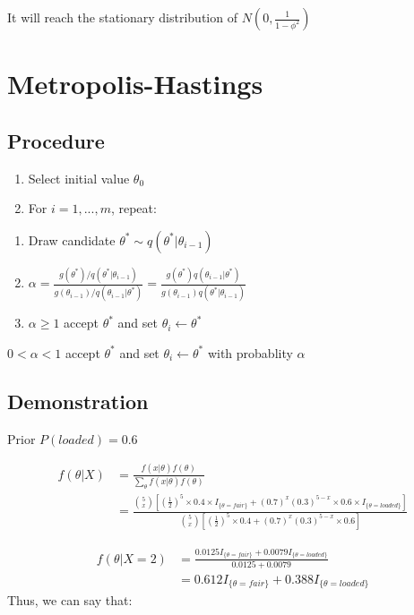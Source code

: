 \documentclass[]{book}
\begin{document}
It will reach the stationary distribution of
\(N(0, \frac{1}{1-\phi^2})\)

\section{Metropolis-Hastings}\label{metropolis-hastings}

\subsection{Procedure}\label{procedure}

\begin{enumerate}
\def\labelenumi{(\arabic{enumi})}
\item
  Select initial value \(\theta_0\)
\item
  For \(i=1,..., m\), repeat:
\end{enumerate}

\begin{enumerate}
\def\labelenumi{(\alph{enumi})}
\item
  Draw candidate \(\theta^* \sim q(\theta^*|\theta_{i-1})\)
\item
  \(\alpha=\frac{g(\theta^*)/q(\theta^*|\theta_{i-1})}{g(\theta_{i-1})/q(\theta_{i-1}|\theta^*)}=\frac{g(\theta^*)q(\theta_{i-1}|\theta^*)}{g(\theta_{i-1})q(\theta^*|\theta_{i-1})}\)
\item
  \(\alpha \geq 1\) accept \(\theta^*\) and set
  \(\theta_i \leftarrow \theta^*\)
\end{enumerate}

\(0<\alpha < 1\) accept \(\theta^*\) and set
\(\theta_i \leftarrow \theta^*\) with probablity \(\alpha\)

\subsection{Demonstration}\label{demonstration}

Prior \(P(loaded)=0.6\)

\[\begin{aligned} f(\theta | X) &= \frac{f(x|\theta) f(\theta)}{\sum_{\theta} f(x|\theta)f(\theta)} \\ &=\frac{\binom{5}{x} [(\frac{1}{2})^5 \times 0.4 \times I_{\{\theta=fair \}}+ (0.7)^x(0.3)^{5-x} \times 0.6 \times I_{\{\theta=loaded \}}]}{\binom{5}{x} [(\frac{1}{2})^5 \times 0.4 + (0.7)^x(0.3)^{5-x} \times 0.6]}  \end{aligned}\]

\[\begin{aligned} f(\theta |X=2) &=\frac{0.0125 I_{\{\theta=fair \}}+0.0079 I_{\{\theta=loaded \}} }{0.0125+0.0079} \\ &= 0.612 I_{\{\theta=fair \}} + 0.388 I_{\{\theta=loaded \}} \end{aligned}\]
Thus, we can say that:
\end{document}

